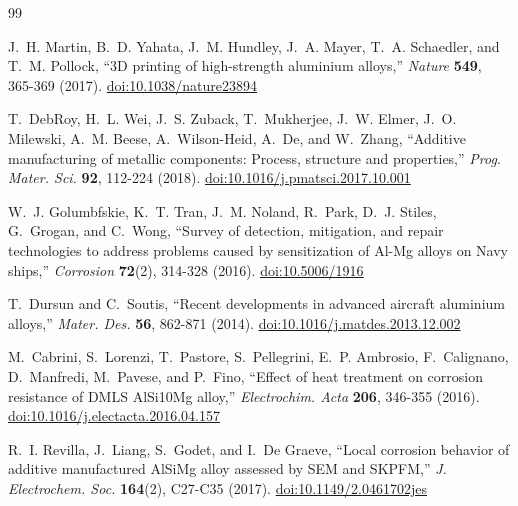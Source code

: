 \documentclass[12pt,letterpaper]{article}
\begin{document}
\clearpage
\setcounter{page}{1}
\renewcommand{\thepage}{R-\arabic{page}}
{}
\begin{thebibliography}{99}
\setlength{\itemsep}{1pt}

J.~H. Martin, B.~D. Yahata, J.~M. Hundley, J.~A. Mayer, T.~A. Schaedler, and
T.~M. Pollock, ``3D printing of high-strength aluminium alloys,''
\emph{Nature} \textbf{549}, 365-369 (2017).
\href{https://doi.org/10.1038/nature23894}{doi:10.1038/nature23894}

T.~DebRoy, H.~L. Wei, J.~S. Zuback, T.~Mukherjee, J.~W. Elmer,
J.~O. Milewski, A.~M. Beese, A.~Wilson-Heid, A.~De, and W.~Zhang, ``Additive
manufacturing of metallic components: Process, structure and properties,''
\emph{Prog. Mater. Sci.} \textbf{92}, 112-224 (2018).
\href{https://doi.org/10.1016/j.pmatsci.2017.10.001}{doi:10.1016/j.pmatsci.2017.10.001}

W.~J. Golumbfskie, K.~T. Tran, J.~M. Noland, R.~Park, D.~J. Stiles,
G.~Grogan, and C.~Wong, ``Survey of detection, mitigation, and repair
technologies to address problems caused by sensitization of Al-Mg alloys on
Navy ships,'' \emph{Corrosion} \textbf{72}(2), 314-328 (2016).
\href{https://doi.org/10.5006/1916}{doi:10.5006/1916}

T.~Dursun and C.~Soutis, ``Recent developments in advanced aircraft
aluminium alloys,'' \emph{Mater. Des.} \textbf{56}, 862-871 (2014).
\href{https://doi.org/10.1016/j.matdes.2013.12.002}{doi:10.1016/j.matdes.2013.12.002}

M.~Cabrini, S.~Lorenzi, T.~Pastore, S.~Pellegrini, E.~P. Ambrosio,
F.~Calignano, D.~Manfredi, M.~Pavese, and P.~Fino, ``Effect of heat treatment
on corrosion resistance of DMLS AlSi10Mg alloy,'' \emph{Electrochim. Acta}
\textbf{206}, 346-355 (2016).
\href{https://doi.org/10.1016/j.electacta.2016.04.157}{doi:10.1016/j.electacta.2016.04.157}

R.~I. Revilla, J.~Liang, S.~Godet, and I.~De Graeve, ``Local corrosion
behavior of additive manufactured AlSiMg alloy assessed by SEM and SKPFM,''
\emph{J. Electrochem. Soc.} \textbf{164}(2), C27-C35 (2017).
\href{https://doi.org/10.1149/2.0461702jes}{doi:10.1149/2.0461702jes}


\end{thebibliography}
\end{document}
